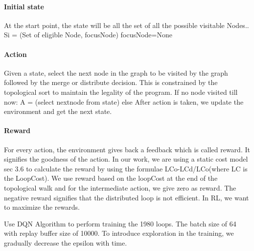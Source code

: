 \paragraph{Initial state} At the start point, the state will be all the set of all the possible visitable Nodes..
Si = ({Set of eligible Node}, focusNode) focusNode=None 

\paragraph{Action} 
Given a state, select the next node in the graph to be visited by the graph followed by the merge or distribute decision. This is constrained by the topological sort to maintain the legality of the program.
If no node visited till now:
	A = (select nextnode from state)
else
After action is taken, we update the environment and get the next state.

\paragraph{Reward} For every action, the environment gives back a feedback which is called reward. It signifies the goodness of the action. In our work, we are using a static cost model sec 3.6 to calculate the reward by using the formulae LCo-LCd/LCo(where LC is the LoopCost). We use reward based on the loopCost at the end of the topological walk and for the intermediate action, we give zero as reward. The negative reward signifies that the distributed loop is not efficient. In RL, we want to maximize the rewards.

	Use DQN Algorithm to perform training the 1980 loops. The batch size of 64 with replay buffer size of 10000. To introduce  exploration in the training, we gradually decrease the epsilon with time. 
